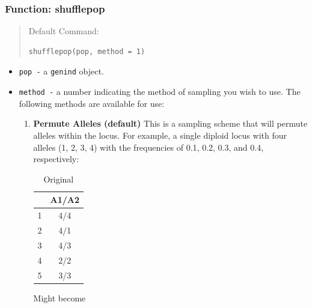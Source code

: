 \documentclass[letterpaper]{article}\usepackage[]{graphicx}\usepackage[]{color}
\makeatletter
\newenvironment{kframe}{%
 \def\at@end@of@kframe{}%
 \ifinner\ifhmode%
  \def\at@end@of@kframe{\end{minipage}}%
  \begin{minipage}{\columnwidth}%
 \fi\fi%
 \def\FrameCommand##1{\hskip\@totalleftmargin \hskip-\fboxsep
 \colorbox{shadecolor}{##1}\hskip-\fboxsep
     \hskip-\linewidth \hskip-\@totalleftmargin \hskip\columnwidth}%
 \MakeFramed {\advance\hsize-\width
   \@totalleftmargin\z@ \linewidth\hsize
   \@setminipage}}%
 {\par\unskip\endMakeFramed%
 \at@end@of@kframe}
\newenvironment{knitrout}{}{} %
\makeatother
\begin{document}
\subsubsection{Function: shufflepop}
\label{data.manip:shuffle:shufflepop}
\begin{quote}
Default Command:
\begin{knitrout}
\color{fgcolor}\begin{kframe}
\begin{verbatim}
shufflepop(pop, method = 1)
\end{verbatim}
\end{kframe}
\end{knitrout}

\end{quote}
\begin{itemize}
  \item \texttt{pop -} a \texttt{genind} object.
  \item \texttt{method -} a number indicating the method of sampling you wish to use. 
  The following methods are available for use:
  \begin{enumerate}
    \item \textbf{Permute Alleles (default)} This is a sampling scheme that will permute alleles within the locus. For example, a single diploid locus with four alleles (1, 2, 3, 4) with the frequencies of 0.1, 0.2, 0.3, and 0.4, respectively:
\begin{table}[h!]
\centering
\begin{tabular}{lc}
          \hline
            & A1/A2 \\ 
          \hline
          1 & 4/4 \\ 
          2 & 4/1 \\ 
          3 & 4/3 \\ 
          4 & 2/2 \\ 
          5 & 3/3 \\ 
           \hline
        \end{tabular}
        \caption{Original}
        \label{tab:original}
\end{table}
\newpage
Might become
\begin{table}[h!]
\centering
\makebox[0pt][c]{\parbox{\textwidth}{%
}}
\end{table}
\end{enumerate}
\end{itemize}
\end{document}
